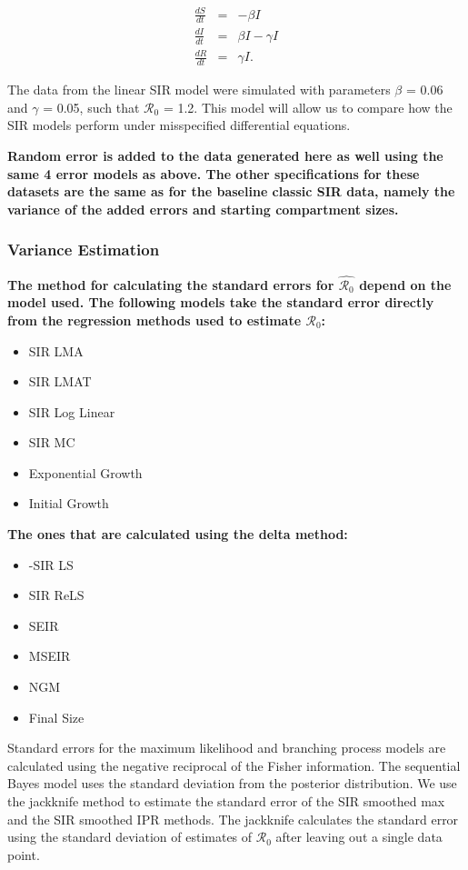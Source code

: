 \documentclass[12pt]{article}
\newcommand{\rr}{\ensuremath{\mathcal{R}_0}}
\begin{document}
	\begin{eqnarray*}
		\frac{dS}{dt} &=& -\beta I \\
		\frac{dI}{dt} &=& \beta I - \gamma I \\
		\frac{dR}{dt} &=& \gamma I.
	\end{eqnarray*}

 The data from the linear SIR model were simulated with parameters $\beta$ = 0.06 and $\gamma$ = 0.05, such that $\rr$ = 1.2. This model will allow us to compare how the SIR models perform under misspecified differential equations.
 
 \textbf{Random error is added to the data generated here as well using the same 4 error models as above. The other specifications for these datasets are the same as for the baseline classic SIR data, namely the variance of the added errors and starting compartment sizes.}

\subsubsection{Variance Estimation}

\textbf{The method for calculating the standard errors for $\hat{\rr}$ depend on the model used. The following models take the standard error directly from the regression methods used to estimate $\rr$:}

	\begin{itemize}
		\item SIR LMA
		\item SIR LMAT
		\item SIR Log Linear
		\item SIR MC
		\item Exponential Growth
		\item Initial Growth
	\end{itemize}

\textbf{The ones that are calculated using the delta method:}
	
	\begin{itemize}
		\item-SIR LS
		\item SIR ReLS
		\item SEIR
		\item MSEIR
		\item NGM
		\item Final Size
	\end{itemize}
	

Standard errors for the maximum likelihood and branching process models are calculated using the negative reciprocal of the Fisher information. The sequential Bayes model uses the standard deviation from the posterior distribution. We use the jackknife method to estimate the standard error of the SIR smoothed max and the SIR smoothed IPR methods. The jackknife calculates the standard error using the standard deviation of estimates of $\rr$ after leaving out a single data point.
	
\end{document}

